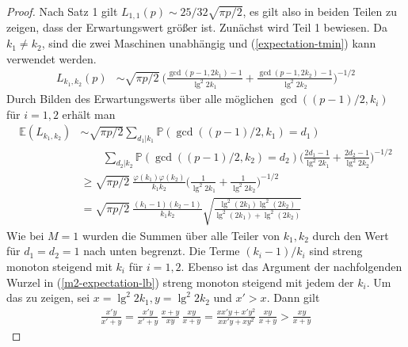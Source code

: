\documentclass[a4paper, 10pt, ngerman]{article}
\newcommand{\E}{\mathbb{E}}
\renewcommand{\P}{\mathbb{P}}
\begin{document}
    \begin{proof}
        Nach Satz 1 gilt $L_{1, 1}(p) \sim 25/32 \sqrt{\pi p /2}$, es gilt also in beiden Teilen zu zeigen, dass der Erwartungswert größer ist. Zunächst wird Teil 1 bewiesen. Da $k_1 \ne k_2$, sind die zwei Maschinen unabhängig und (\ref{expectation-tmin}) kann verwendet werden.
        \begin{align*}
            L_{k_1, k_2}(p)
             & \sim \sqrt{\pi p / 2} \
            \Bigg ( \frac {\gcd(p - 1, 2k_1) - 1} {\lg^2 2k_1} +
            \frac {\gcd(p -1, 2k_2) - 1} {\lg^2 2k_2} \Bigg )^{-1/2}
        \end{align*}
        Durch Bilden des Erwartungswerts über alle möglichen $\gcd((p - 1)/2, k_i)$ für $i = 1, 2$ erhält man
        \begin{align}
            \E(L_{k_1, k_2})
             & \sim \sqrt{\pi p / 2}
            \sum_{d_1 | k_1} \P(\gcd((p - 1)/2, k_1) = d_1)
            \nonumber                                                 \\
             & \qquad \sum_{d_2 | k_2} \P(\gcd((p - 1)/2, k_2) = d_2)
            \Bigg ( \frac {2d_1 - 1} {\lg^2 2k_1}
            + \frac {2d_2 - 1} {\lg^2 2k_2} \Bigg )^{-1/2}
            \nonumber                                                 \\
             & \ge \sqrt{\pi p / 2} \
            \frac {\varphi(k_1) \varphi(k_2)} {k_1k_2}
            \Bigg (\frac 1 {\lg^2 2k_1} + \frac 1 {\lg^2 2k_2} \Bigg )^{-1/2}
            \nonumber                                                 \\
             & = \sqrt{\pi p / 2} \
            \frac {(k_1 - 1) (k_2- 1)} {k_1k_2}
            \sqrt{\frac{\lg^2(2k_1) \lg^2(2k_2)}{\lg^2(2k_1) + \lg^2(2k_2)}}
            \label{m2-expectation-lb}
        \end{align}
        Wie bei $M = 1$ wurden die Summen über alle Teiler von $k_1, k_2$ durch den Wert für $d_1 = d_2 = 1$ nach unten begrenzt. Die Terme $(k_i - 1)/k_i$ sind streng monoton steigend mit $k_i$ für $i = 1, 2$. Ebenso ist das Argument der nachfolgenden Wurzel in (\ref{m2-expectation-lb}) streng monoton steigend mit jedem der $k_i$. Um das zu zeigen, sei $x = \lg^2 2k_1, y = \lg^2 2k_2$ und $x' > x$. Dann gilt
        \begin{align*}
            \frac {x'y} {x' + y}
            = \frac {x'y} {x' + y} \, \frac {x + y} {xy} \, \frac {xy} {x + y}
            = \frac {xx'y + x'y^2} {xx'y + xy^2} \, \frac {xy} {x + y}
            > \frac {xy} {x + y}

\end{align*}
\end{proof}
\end{document}

